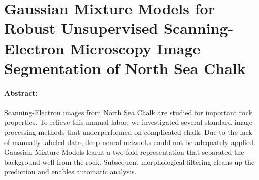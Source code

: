 \section[Gaussian Mixture Models for Robust Unsupervised Scanning-Electron Microscopy Image Segmentation of North Sea Chalk]{Gaussian Mixture Models for Robust Unsupervised Scanning-Electron Microscopy Image Segmentation of North Sea Chalk}
\label{section:gaussian}
\paragraph{Abstract:} Scanning-Electron images from North Sea Chalk are studied for important rock properties. To relieve this manual labor, we investigated several standard image processing methods that underperformed on complicated chalk. Due to the lack of manually labeled data, deep neural networks could not be adequately applied. Gaussian Mixture Models learnt a two-fold representation that separated the background well from the rock. Subsequent morphological filtering cleans up the prediction and enables automatic analysis. 

{\vfill\hfill\newline{}}
